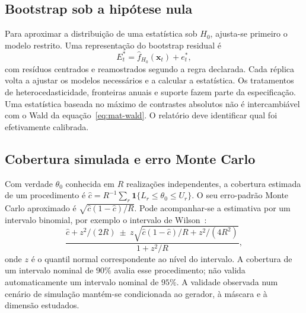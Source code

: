 \subsection{Bootstrap sob a hipótese nula}
\label{sec:mat-bootstrap-nulo}
Para aproximar a distribuição de uma estatística sob $H_0$, ajusta-se primeiro o modelo restrito. Uma representação do bootstrap residual é
\begin{equation}
E_t^*=\widehat f_{H_0}(\boldsymbol x_t)+e_t^*,
\label{eq:mat-bootstrap-nulo}
\end{equation}
com resíduos centrados e reamostrados segundo a regra declarada. Cada réplica volta a ajustar os modelos necessários e a calcular a estatística. Os tratamentos de heterocedasticidade, fronteiras anuais e suporte fazem parte da especificação. Uma estatística baseada no máximo de contrastes absolutos não é intercambiável com o Wald da equação~\ref{eq:mat-wald}. O relatório deve identificar qual foi efetivamente calibrada.


\subsection{Cobertura simulada e erro Monte Carlo}
\label{sec:mat-cobertura-mc}
Com verdade $\theta_0$ conhecida em $R$ realizações independentes, a cobertura estimada de um procedimento é $\widehat c=R^{-1}\sum_r\mathbf1\{L_r\leq\theta_0\leq U_r\}$. O seu erro-padrão Monte Carlo aproximado é $\sqrt{\widehat c(1-\widehat c)/R}$. Pode acompanhar-se a estimativa por um intervalo binomial, por exemplo o intervalo de Wilson~\parencite{Wilson1927}:
\begin{equation}
\frac{\widehat c+z^2/(2R)\ \pm\ z\sqrt{\widehat c(1-\widehat c)/R+z^2/(4R^2)}}{1+z^2/R},
\label{eq:mat-wilson}
\end{equation}
onde $z$ é o quantil normal correspondente ao nível do intervalo. A cobertura de um intervalo nominal de $90\%$ avalia esse procedimento; não valida automaticamente um intervalo nominal de $95\%$. A validade observada num cenário de simulação mantém-se condicionada ao gerador, à máscara e à dimensão estudados.

